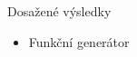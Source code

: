 \documentclass[aspectratio=1610]{beamer}
\begin{document}
\begin{frame}{Dosažené výsledky}
    \begin{itemize}
        \item Funkční generátor
    \end{itemize}
\end{frame}


\end{document}
